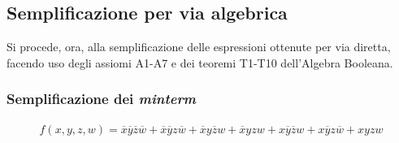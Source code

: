 \documentclass[a4paper]{extarticle}
\begin{document}
\vspace{1em}
\subsection{Semplificazione per via algebrica}
Si procede, ora, alla semplificazione delle espressioni ottenute per via diretta, facendo uso degli assiomi A1-A7 e dei teoremi T1-T10 dell’Algebra Booleana.

\vspace{1em}
\subsubsection{Semplificazione dei \emph{minterm}}
\begin{align*}
  f(x,y,z,w) = \overline{x}\overline{y}\overline{z}\overline{w} + \overline{x}\overline{y}z\overline{w} + \overline{x}y\overline{z}w + \overline{x}yzw + x\overline{y}\overline{z}w + x\overline{y}z\overline{w} + xyzw
\end{align*}
\end{document}
